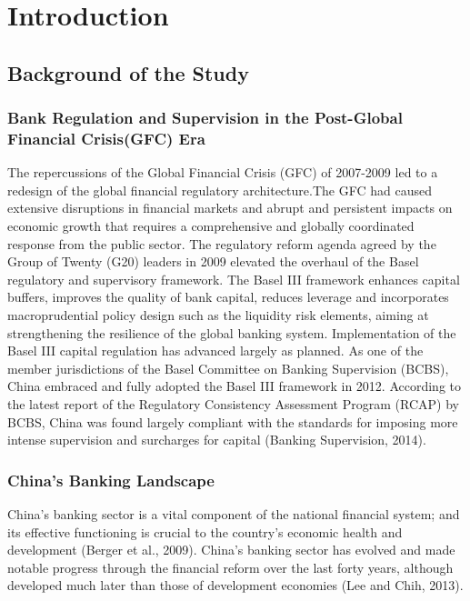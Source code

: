\documentclass[
  12pt,
  a4paper,
]{scrreprt}
\begin{document}
{{{{


\chapter{Introduction}\label{introduction}

\section{Background of the Study}\label{background-of-the-study}

\subsection{Bank Regulation and Supervision in the Post-Global Financial
Crisis(GFC)
Era}\label{bank-regulation-and-supervision-in-the-post-global-financial-crisisgfc-era}

The repercussions of the Global Financial Crisis (GFC) of 2007-2009 led
to a redesign of the global financial regulatory architecture.The GFC
had caused extensive disruptions in financial markets and abrupt and
persistent impacts on economic growth that requires a comprehensive and
globally coordinated response from the public sector. The regulatory
reform agenda agreed by the Group of Twenty (G20) leaders in 2009
elevated the overhaul of the Basel regulatory and supervisory framework.
The Basel III framework enhances capital buffers, improves the quality
of bank capital, reduces leverage and incorporates macroprudential
policy design such as the liquidity risk elements, aiming at
strengthening the resilience of the global banking system.
Implementation of the Basel III capital regulation has advanced largely
as planned. As one of the member jurisdictions of the Basel Committee on
Banking Supervision (BCBS), China embraced and fully adopted the Basel
III framework in 2012. According to the latest report of the Regulatory
Consistency Assessment Program (RCAP) by BCBS, China was found largely
compliant with the standards for imposing more intense supervision and
surcharges for capital (Banking Supervision, 2014).

\subsection{China's Banking Landscape}\label{chinas-banking-landscape}

China's banking sector is a vital component of the national financial
system; and its effective functioning is crucial to the country's
economic health and development (Berger et al., 2009). China's banking
sector has evolved and made notable progress through the financial
reform over the last forty years, although developed much later than
those of development economies (Lee and Chih, 2013).

}}}}
\end{document}
